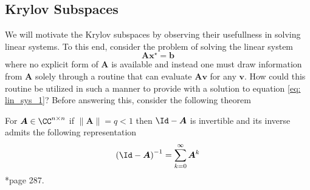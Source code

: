 
\subsection{Krylov Subspaces}\label{Section4.1}

We will motivate the Krylov subspaces by observing their usefullness in solving linear systems. To this end, consider the problem of solving the linear system
\begin{equation}\label{eq: lin_sys_1}
    \bm{A} \bm{x^{\star}} = \bm{b}
\end{equation}
where no explicit form of $\bm{A}$ is available and instead one must draw information from $\bm{A}$ solely through a routine that can evaluate $\bm{A} \bm{v}$ for any $\bm{v}$. How could this routine be utilized in such a manner to provide with a solution to equation \ref{eq: lin_sys_1}? Before answering this, consider the following theorem

\begin{thm} \label{theorem: invert_mat_norm}
    For $\bm{A} \in \CC^{n \times n}$ if $\| \bm{A} \| = q < 1$ then $\Id - \bm{A}$ is invertible and its inverse admits the following representation
    \begin{equation*} \label{eq: convg-of-part}
        \left( \Id - \bm{A} \right)^{-1} = \sum_{k=0}^{\infty} \bm{A}^k
    \end{equation*}
    \cite{BerezanskyMakarovich1996FaV1}*{page 287}.
\end{thm}

